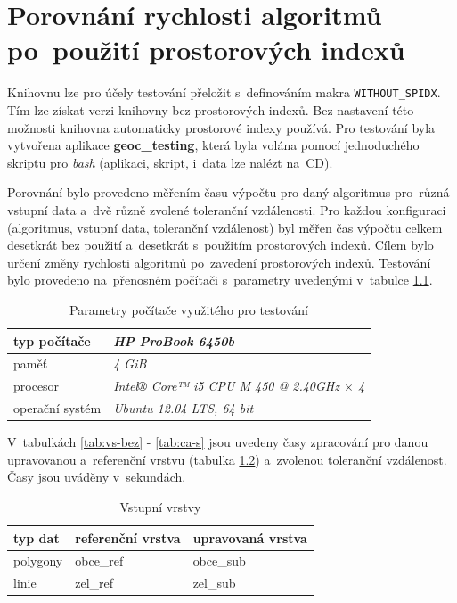 \chapter[Porovnání rychlosti algoritmů]{Porovnání rychlosti algoritmů po~použití prostorových indexů}
\label{priloha-testovani}

Knihovnu  lze pro účely testování přeložit s~definováním makra 
\texttt{WITHOUT\_SPIDX}. Tím lze získat verzi knihovny bez prostorových indexů.
Bez nastavení této možnosti knihovna automaticky prostorové indexy používá. 
Pro testování byla vytvořena aplikace \textbf{geoc\_testing}, která byla 
volána pomocí jednoduchého skriptu pro \textit{bash} (aplikaci, skript,
 i~data lze nalézt na~CD). 

Porovnání bylo provedeno měřením času výpočtu pro daný algoritmus
pro~různá vstup\-ní data a~dvě různě zvolené toleranční vzdálenosti.
Pro každou konfiguraci (algoritmus, vstupní data, toleranční vzdálenost)
byl měřen čas výpočtu celkem desetkrát bez použití a~desetkrát s~použitím
prostorových indexů. Cílem bylo určení změny rychlosti algoritmů po~zavedení
prostorových indexů. Testování bylo provedeno na~přenosném počítači 
s~parametry uvedenými v~tabulce \ref{tab:parametry}. 

\begin{table}[H]
 \centering
  \caption{Parametry počítače využitého pro testování}
\begin{tabular}{|l|l|}
\hline
 typ počítače & \textit{HP ProBook 6450b} \\
\hline
 paměť & \textit{4 GiB} \\
\hline
 procesor &\textit{Intel® Core™ i5 CPU M 450 @ 2.40GHz $\times$ 4 }\\
\hline
 operační systém &\textit{Ubuntu 12.04 LTS, 64 bit}\\
\hline
\end{tabular}
  \label{tab:parametry}
\end{table}

V~tabulkách \ref{tab:vs-bez} - \ref{tab:ca-s} jsou uvedeny časy zpracování pro 
danou upravovanou a~re\-ferenční vrstvu (tabulka \ref{tab:vstup}) a~zvolenou 
toleranční vzdálenost. Časy jsou uváděny v~sekundách. 

\begin{table}[H]
 \centering
  \caption{Vstupní vrstvy}
\begin{tabular}{|l|l|l|}
\hline
 typ dat & referenční vrstva & upravovaná vrstva \\
\hline
\hline
 polygony & obce\_ref & obce\_sub \\
 linie & zel\_ref & zel\_sub \\
 \hline
\end{tabular}
  \label{tab:vstup}
\end{table}

